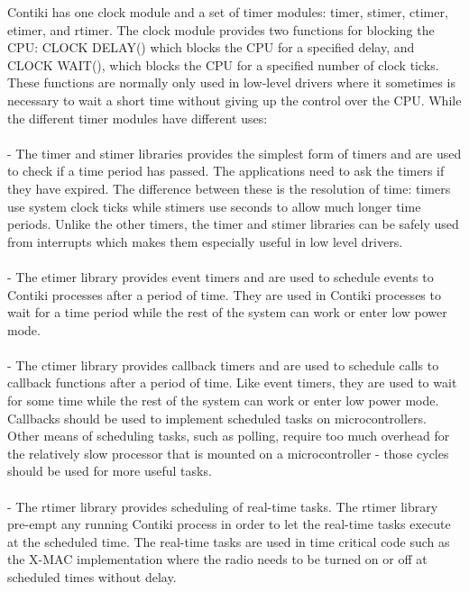\documentclass[a4paper,10pt]{article}
\begin{document}
\begin{multicols}{2}
Contiki has one clock module and a set of timer modules: timer, stimer, ctimer, etimer, and rtimer. 
The clock module provides two functions for blocking the CPU: CLOCK DELAY() which blocks the CPU for a specified delay, and CLOCK WAIT(), which blocks the CPU for a specified number of clock ticks. These functions are normally only used in low-level drivers where it sometimes is necessary to wait a short time without giving up the control over the CPU.
While the different timer modules \cite{support} have different uses:\\\\ 
- The timer and stimer libraries provides the simplest form of timers and are used to check if a time period has passed. The applications need to ask the timers if they have expired. The difference between these is the resolution of time: timers use system clock ticks while stimers use seconds to allow much longer time periods. Unlike the other timers, the timer and stimer libraries can be safely used from interrupts which makes them especially useful in low level drivers.\\\\
- The etimer library provides event timers and are used to schedule events to Contiki processes after a period of time. They are used in Contiki processes to wait for a time period while the rest of the system can work or enter low power mode.\\\\
- The ctimer library provides callback timers and are used to schedule calls to callback functions after a period of time. Like event timers, they are used to wait for some time while the rest of the system can work or enter low power mode. Callbacks should be used to implement scheduled tasks on microcontrollers. Other means of scheduling tasks, such as polling, require too much overhead for the relatively slow processor that is mounted on a microcontroller - those cycles should be used for more useful tasks.\\\\
- The rtimer library provides scheduling of real-time tasks. The rtimer library pre-empt any running Contiki process in order to let the real-time tasks execute at the scheduled time. The real-time tasks are used in time critical code such as the X-MAC implementation where the radio needs to be turned on or off at scheduled times without delay.




\end{multicols}
\end{document}
